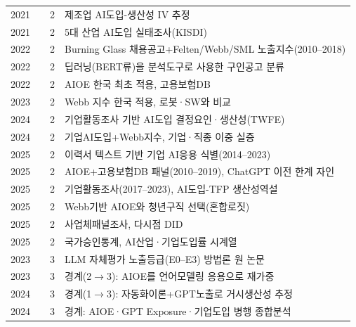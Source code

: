 \documentclass[11pt]{article}
\begin{document}
\begin{longtable}{L{0.9cm}L{4.6cm}L{0.9cm}L{6.2cm}}
2021 & \textcite{kiet-2021-ai-adoption-productivity} & 2 & 제조업 AI도입-생산성 IV 추정 \\
2021 & \textcite{kim-2021-ai-adoption-status-major-industries} & 2 & 5대 산업 AI도입 실태조사(KISDI) \\
2022 & \textcite{acemoglu-2022-artificial-intelligence-and-jobs-evidence} & 2 & Burning Glass 채용공고+Felten/Webb/SML 노출지수(2010--2018) \\
2022 & \textcite{chang-2022-deep-learning-job-classification-system} & 2 & 딥러닝(BERT류)을 분석도구로 사용한 구인공고 분류 \\
2022 & \textcite{cheon-2022-ai-employment-wage-effects} & 2 & AIOE 한국 최초 적용, 고용보험DB \\
2023 & \textcite{han-2023-ai-and-labor-market-change} & 2 & Webb 지수 한국 적용, 로봇·SW와 비교 \\
2024 & \textcite{kiet-2024-ai-adoption-firms-policy} & 2 & 기업활동조사 기반 AI도입 결정요인·생산성(TWFE) \\
2024 & \textcite{kiet-2024-ai-labor-market-industry} & 2 & 기업AI도입+Webb지수, 기업·직종 이중 실증 \\
2025 & \textcite{hampole-2025-artificial-intelligence-and-the-labor} & 2 & 이력서 텍스트 기반 기업 AI응용 식별(2014--2023) \\
2025 & \textcite{kiet-2025-ai-occupational-employment-effect} & 2 & AIOE+고용보험DB 패널(2010--2019), ChatGPT 이전 한계 자인 \\
2025 & \textcite{kim-2025-ai-adoption-firm-performance} & 2 & 기업활동조사(2017--2023), AI도입-TFP 생산성역설 \\
2025 & \textcite{kim-2025-youth-job-choice-ai-exposure} & 2 & Webb기반 AIOE와 청년구직 선택(혼합로짓) \\
2025 & \textcite{lee-2025-ai-adoption-determinants-performance} & 2 & 사업체패널조사, 다시점 DID \\
2025 & \textcite{spri-2024-ai-industry-survey} & 2 & 국가승인통계, AI산업·기업도입률 시계열 \\
2023 & \textcite{eloundou-2023-gpts-are-gpts-an-early} & 3 & LLM 자체평가 노출등급(E0--E3) 방법론 원 논문 \\
2023 & \textcite{felten-2023-how-will-language-modelers-like-chatgpt} & 3 & 경계(2$\to$3): AIOE를 언어모델링 응용으로 재가중 \\
2024 & \textcite{acemoglu-2024-the-simple-macroeconomics-of-ai} & 3 & 경계(1$\to$3): 자동화이론+GPT노출로 거시생산성 추정 \\
2024 & \textcite{chang-2024-ai-development-employment-effects} & 3 & 경계: AIOE·GPT Exposure·기업도입 병행 종합분석 \\

\end{longtable}
\end{document}
